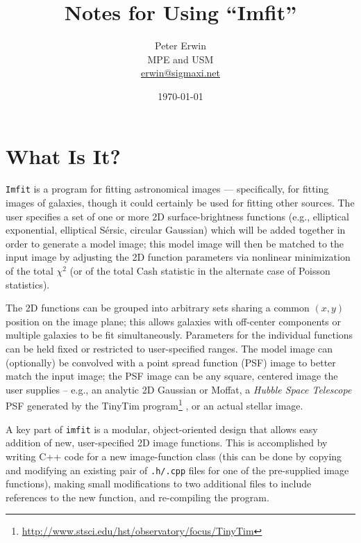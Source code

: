 \documentclass[10pt,a4paper,article]{memoir}
\newcommand{\imfit}{\texttt{imfit}}
\newcommand{\Imfit}{\texttt{Imfit}}
\newcommand{\chisquare}{\ensuremath{\chi^{2}}}
\begin{document}
\title{
  Notes for Using ``Imfit''
}
\author{
  Peter Erwin\\
  MPE and USM\\
  \href{mailto:erwin@sigmaxi.net}{erwin@sigmaxi.net}
}
\date{\today}  %

\maketitle

\tableofcontents


\chapter{What Is It?}

\Imfit{} is a program for fitting astronomical images --- 
specifically, for fitting images of galaxies, though it could certainly
be used for fitting other sources. The user specifies a set of one or
more 2D surface-brightness functions (e.g., elliptical exponential, elliptical S\'ersic,
circular Gaussian) which will be added together in order to generate a
model image; this model image will then be matched to the input image by
adjusting the 2D function parameters via nonlinear minimization of the total
\chisquare{} (or of the total Cash statistic in the alternate case of Poisson
statistics).

The 2D functions can be grouped into arbitrary sets sharing a common $(x,y)$
position on the image plane; this allows galaxies with off-center components
or multiple galaxies to be fit simultaneously. Parameters for the individual
functions can be held fixed or restricted to user-specified ranges. The
model image can (optionally) be convolved with a point spread
function (PSF) image to better match the input image; the PSF image can
be any square, centered image the user supplies -- e.g., an analytic 2D Gaussian
or Moffat, a \textit{Hubble Space Telescope} PSF generated by the TinyTim
program\footnote{\url{http://www.stsci.edu/hst/observatory/focus/TinyTim}} \citep{krist95}, 
or an actual stellar image.

A key part of \imfit{} is a modular, object-oriented design that allows easy
addition of new, user-specified 2D image functions. This is accomplished by
writing C++ code for a new image-function class (this can be done by copying and
modifying an existing pair of \texttt{.h/.cpp} files for one of the pre-supplied
image functions), making small modifications to two additional files to include
references to the new function, and re-compiling the program.
\end{document}
